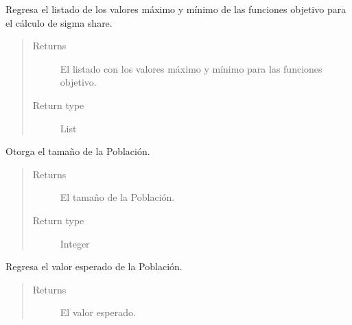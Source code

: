 \documentclass[letterpaper,10pt,english]{sphinxmanual}
\begin{document}
\begin{fulllineitems}
\begin{fulllineitems}
\label{Model/Community/Population/Population:Model.Community.Population.Population.Population.get_objective_functions_extreme_values}
Regresa el listado de los valores máximo y mínimo de las 
funciones objetivo para el cálculo de sigma share.
\begin{quote}\begin{description}
\item[{Returns}] \leavevmode
El listado con los valores máximo y mínimo para las
funciones objetivo.

\item[{Return type}] \leavevmode
List

\end{description}\end{quote}

\end{fulllineitems}


\begin{fulllineitems}
\label{Model/Community/Population/Population:Model.Community.Population.Population.Population.get_size}
Otorga el tamaño de la Población.
\begin{quote}\begin{description}
\item[{Returns}] \leavevmode
El tamaño de la Población.

\item[{Return type}] \leavevmode
Integer

\end{description}\end{quote}

\end{fulllineitems}


\begin{fulllineitems}
\label{Model/Community/Population/Population:Model.Community.Population.Population.Population.get_total_expected_value}
Regresa el valor esperado de la Población.
\begin{quote}\begin{description}
\item[{Returns}] \leavevmode
El valor esperado.


\end{description}
\end{quote}
\end{fulllineitems}
\end{fulllineitems}
\end{document}
